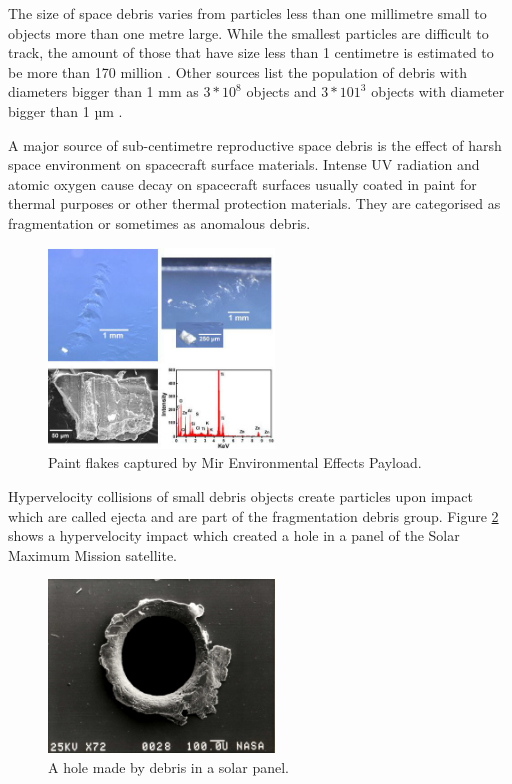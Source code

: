 	The size of space debris varies from particles less than one millimetre small to objects more than one metre large. While the smallest particles are difficult to track, the amount of those that have size less than 1 centimetre is estimated to be more than 170 million \citep{esabr336}. Other sources list the population of debris with diameters bigger than 1 mm as $3*10^8$ objects and $3*101^3$ objects with diameter bigger than 1 µm \citep{klinkrad2006space}. 

	A major source of sub-centimetre reproductive space debris is the effect of harsh space environment on spacecraft surface materials. Intense UV radiation and atomic oxygen cause decay on spacecraft surfaces usually coated in paint for thermal purposes or other thermal protection materials. They are categorised as fragmentation or sometimes as anomalous debris.
	
\begin{figure}[H]
	\centering
  \includegraphics[width=6cm]{images/paintflakes}
  \caption{Paint flakes captured by Mir Environmental Effects Payload.}
  \label{fig:paintflakes}
\end{figure}
	
	Hypervelocity collisions of small debris objects create particles upon impact which are called ejecta and are part of the fragmentation debris group. Figure \ref{fig:hypervelocitycollision} shows a hypervelocity impact which created a hole in a panel of the Solar Maximum Mission satellite.
	
\begin{figure}[H]
\centering
  \includegraphics[width=6cm]{images/hypervelocitycollision}
  \caption{A hole made by debris in a solar panel.}
  \label{fig:hypervelocitycollision}
\end{figure}	
	
